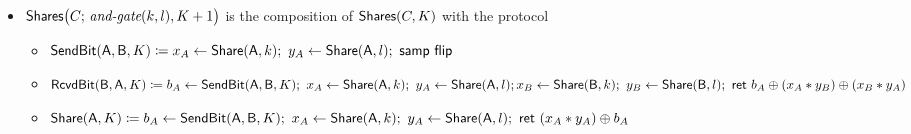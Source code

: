 \begin{itemize}
\item $\mathsf{Shares}\big(C; \, \textit{and-gate}(k,l),K+1\big)$ is the composition of $\mathsf{Shares}(C,K)$ with the protocol
\begin{itemize}
\item $\SendBit(\A,\B,K) \coloneqq x_A \leftarrow \Share(\A,k); \ y_A \leftarrow \Share(\A,l); \ \samp{\flip}$
\item $\mathsf{RcvdBit}(\mathsf{B},\mathsf{A},K) \coloneqq b_A \leftarrow \mathsf{SendBit}(\mathsf{A},\mathsf{B},K); \ x_A \leftarrow \mathsf{Share}(\mathsf{A},k); \ y_A \leftarrow \mathsf{Share}(\mathsf{A},l); \\ x_B \leftarrow \mathsf{Share}(\mathsf{B},k); \ y_B \leftarrow \mathsf{Share}(\mathsf{B},l); \ \mathsf{ret} \ b_A \oplus (x_A * y_B) \oplus (x_B * y_A)$
\item $\mathsf{Share}(\mathsf{A},K) \coloneqq b_A \leftarrow \mathsf{SendBit}(\mathsf{A},\mathsf{B},K); \ x_A \leftarrow \mathsf{Share}(\mathsf{A},k); \ y_A \leftarrow \mathsf{Share}(\mathsf{A},l); \ \mathsf{ret} \ (x_A * y_A) \oplus b_A$
\end{itemize}
\end{itemize}

